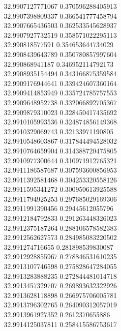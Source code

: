{32.9907127771067	0.370596288405913\\
32.9907398809337	0.366541777458794\\
32.9907665436503	0.362533545628937\\
32.9907927732519	0.358571022295113\\
32.990818577591	0.354653644734029\\
32.9908439643789	0.350780857997604\\
32.990868941187	0.346952114792173\\
32.9908935154494	0.343166875359584\\
32.9909176944641	0.339424607360164\\
32.9909414853949	0.335724785757553\\
32.9909648952738	0.332066892705367\\
32.9909879310023	0.328450417435692\\
32.9910105993536	0.324874856149368\\
32.9910329069743	0.32133971190805\\
32.9910548603867	0.317844494528032\\
32.9910764659904	0.314388720475805\\
32.9910977300644	0.310971912765321\\
32.9911186587687	0.307593600856953\\
32.9911392581468	0.304253320558126\\
32.9911595341272	0.300950613925588\\
32.9911794925253	0.297685029169306\\
32.9911991390456	0.29445612055796\\
32.9912184792833	0.291263448326023\\
32.9912375187264	0.288106578582383\\
32.9912562627573	0.284985083220502\\
32.991274716655	0.281898539830087\\
32.9912928855967	0.278846531610235\\
32.9913107746598	0.275828647284055\\
32.9913283888235	0.272844481014718\\
32.9913457329707	0.269893632322926\\
32.9913628118898	0.266975706005781\\
32.9913796302765	0.264090312057019\\
32.9913961927352	0.2612370655886\\
32.9914125037811	0.258415586753617\\
}
